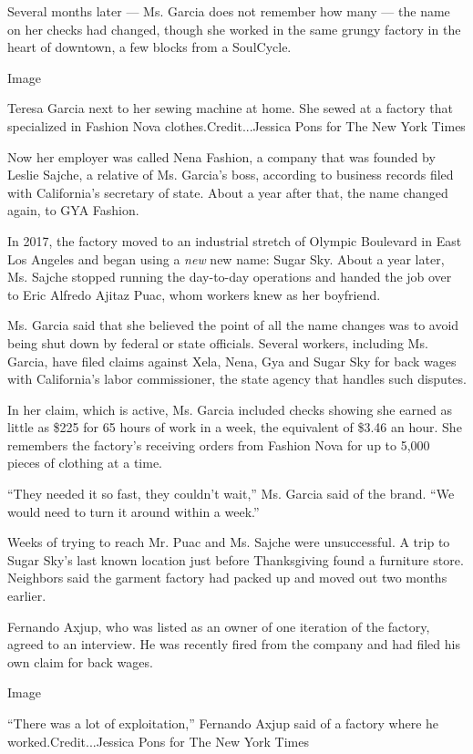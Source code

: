 Several months later --- Ms. Garcia does not remember how many --- the
name on her checks had changed, though she worked in the same grungy
factory in the heart of downtown, a few blocks from a SoulCycle.

Image

Teresa Garcia next to her sewing machine at home. She sewed at a factory
that specialized in Fashion Nova clothes.Credit...Jessica Pons for The
New York Times

Now her employer was called Nena Fashion, a company that was founded by
Leslie Sajche, a relative of Ms. Garcia's boss, according to business
records filed with California's secretary of state. About a year after
that, the name changed again, to GYA Fashion.

In 2017, the factory moved to an industrial stretch of Olympic Boulevard
in East Los Angeles and began using a \emph{new} new name: Sugar Sky.
About a year later, Ms. Sajche stopped running the day-to-day operations
and handed the job over to Eric Alfredo Ajitaz Puac, whom workers knew
as her boyfriend.

Ms. Garcia said that she believed the point of all the name changes was
to avoid being shut down by federal or state officials. Several workers,
including Ms. Garcia, have filed claims against Xela, Nena, Gya and
Sugar Sky for back wages with California's labor commissioner, the state
agency that handles such disputes.

In her claim, which is active, Ms. Garcia included checks showing she
earned as little as \$225 for 65 hours of work in a week, the equivalent
of \$3.46 an hour. She remembers the factory's receiving orders from
Fashion Nova for up to 5,000 pieces of clothing at a time.

``They needed it so fast, they couldn't wait,'' Ms. Garcia said of the
brand. ``We would need to turn it around within a week.''

Weeks of trying to reach Mr. Puac and Ms. Sajche were unsuccessful. A
trip to Sugar Sky's last known location just before Thanksgiving found a
furniture store. Neighbors said the garment factory had packed up and
moved out two months earlier.

Fernando Axjup, who was listed as an owner of one iteration of the
factory, agreed to an interview. He was recently fired from the company
and had filed his own claim for back wages.

Image

``There was a lot of exploitation,'' Fernando Axjup said of a factory
where he worked.Credit...Jessica Pons for The New York Times


